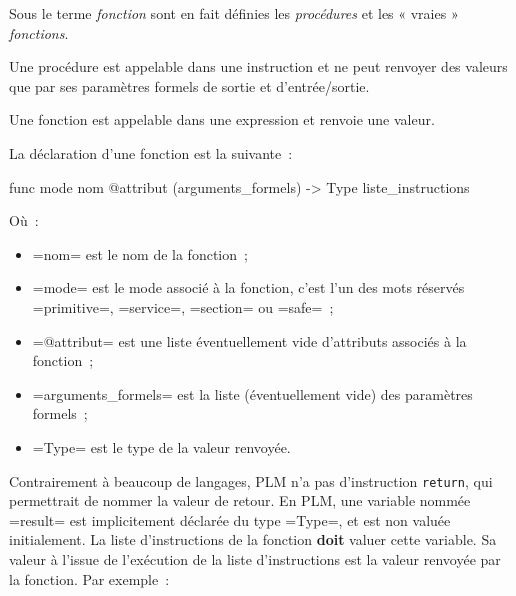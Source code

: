  



















Sous le terme \emph{fonction} sont en fait définies les \emph{procédures} et les « vraies » \emph{fonctions}.

Une procédure est appelable dans une instruction et ne peut renvoyer des valeurs que par ses paramètres formels de sortie et d'entrée/sortie.

Une fonction est appelable dans une expression et renvoie une valeur.






La déclaration d'une fonction est la suivante~:
\begin{PLM}
func mode nom @attribut (arguments_formels) -> Type {
  liste_instructions
}
\end{PLM}
Où~:
\begin{itemize}
  \item \plm=nom= est le nom de la fonction~;
  \item \plm=mode= est le mode associé à la fonction, c'est l'un des mots réservés \plm=primitive=, \plm=service=, \plm=section= ou \plm=safe=~;
  \item \plm=@attribut= est une liste éventuellement vide d'attributs associés à la fonction~;
  \item \plm=arguments_formels= est la liste (éventuellement vide) des paramètres formels~;
  \item \plm=Type= est le type de la valeur renvoyée.
\end{itemize}

Contrairement à beaucoup de langages, PLM n'a pas d'instruction \texttt{return}, qui permettrait de nommer la valeur de retour. En PLM, une variable nommée \plm=result= est implicitement déclarée du type \plm=Type=, et est non valuée initialement. La liste d'instructions de la fonction {\bf doit} valuer cette variable. Sa valeur à l'issue de l'exécution de la liste d'instructions est la valeur renvoyée par la fonction. 
Par exemple~:

